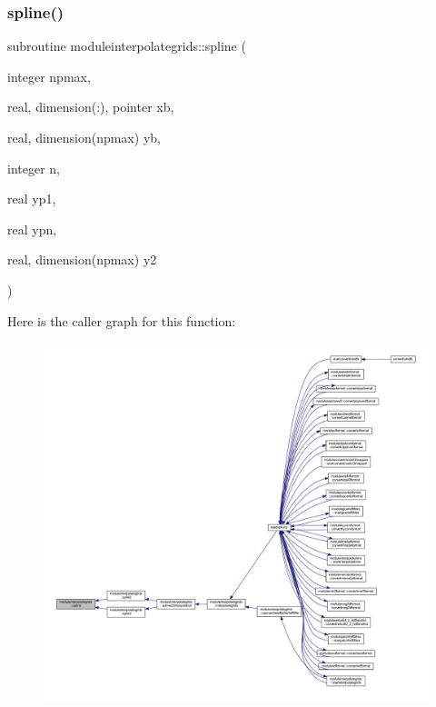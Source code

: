 \subsubsection{\texorpdfstring{spline()}{spline()}}
{\footnotesize\ttfamily subroutine moduleinterpolategrids\+::spline (\begin{DoxyParamCaption}\item[{integer}]{npmax,  }\item[{real, dimension(\+:), pointer}]{xb,  }\item[{real, dimension(npmax)}]{yb,  }\item[{integer}]{n,  }\item[{real}]{yp1,  }\item[{real}]{ypn,  }\item[{real, dimension(npmax)}]{y2 }\end{DoxyParamCaption})\hspace{0.3cm}{\ttfamily [private]}}

Here is the caller graph for this function\+:\nopagebreak
\begin{figure}[H]
\begin{center}
\leavevmode
\includegraphics[width=350pt]{namespacemoduleinterpolategrids_ab307084ecee857465992d138cb9d22d3_icgraph}
\end{center}
\end{figure}
\mbox{\label{namespacemoduleinterpolategrids_a5189e275a7867c5dd3f1a55dca3dacf3}} 

